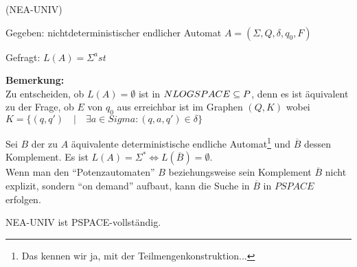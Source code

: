 \begin{definition}
    

     (NEA-UNIV)

    Gegeben: nichtdeterministischer endlicher Automat $A = (\Sigma, Q, \delta, q_0, F)$

    Gefragt: $L(A) = \Sigma^ast$

\end{definition}


\textbf{Bemerkung:}\\
Zu entscheiden, ob $L(A) = \emptyset$ ist in $NLOGSPACE \subseteq P$, denn es ist äquivalent zu der Frage, ob $E$ von $q_0$ aus erreichbar ist im Graphen $(Q,K)$ wobei 
$K = \{ (q, q') \quad | \quad \exists a \in Sigma : (q, a, q') \in \delta \}$

Sei $B$ der zu $A$ äquivalente deterministische endliche Automat\footnote{Das kennen wir ja, mit der Teilmengenkonstruktion...} und $\overline{B}$ dessen Komplement. Es ist $L(A) = \Sigma^\ast \Longleftrightarrow L(\overline{B}) = \emptyset$.
\\
Wenn man den ``Potenzautomaten'' $B$ beziehungsweise sein Komplement $\overline{B}$ nicht explizit, sondern ``on demand'' aufbaut, kann die Suche in $\overline{B}$ in $PSPACE$ erfolgen.




\begin{satz}
    
    NEA-UNIV ist PSPACE-vollständig.

\end{satz}

